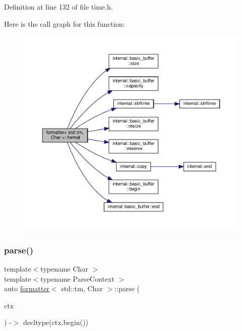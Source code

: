 Definition at line 132 of file time.\+h.

Here is the call graph for this function\+:
\nopagebreak
\begin{figure}[H]
\begin{center}
\leavevmode
\includegraphics[width=350pt]{structformatter_3_01std_1_1tm_00_01_char_01_4_ab9ede05d9788f38bfc435af29d7fefe0_cgraph}
\end{center}
\end{figure}
\mbox{\label{structformatter_3_01std_1_1tm_00_01_char_01_4_a48e18c3d8fc0bf234d6981a60828f5ca}} 
\subsubsection{\texorpdfstring{parse()}{parse()}}
{\footnotesize\ttfamily template$<$typename Char $>$ \\
template$<$typename Parse\+Context $>$ \\
auto \hyperlink{structformatter}{formatter}$<$ std\+::tm, Char $>$\+::parse (\begin{DoxyParamCaption}\item[{Parse\+Context \&}]{ctx }\end{DoxyParamCaption}) -\/$>$ decltype(ctx.\+begin()) \hspace{0.3cm}{\ttfamily [inline]}}



